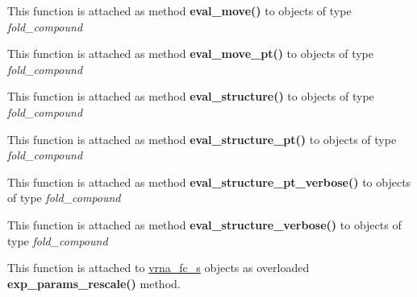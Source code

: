 \begin{DoxyRefList}
\item[\label{wrappers__wrappers000029}%
\hypertarget{wrappers__wrappers000029}{}%
Global \hyperlink{group__eval_gaff1b9e4f4d17b434b0a822fe783672c1}{vrna\+\_\+eval\+\_\+move} (vrna\+\_\+fold\+\_\+compound\+\_\+t $\ast$vc, const char $\ast$structure, int m1, int m2)]This function is attached as method {\bfseries eval\+\_\+move()} to objects of type {\itshape fold\+\_\+compound}  
\item[\label{wrappers__wrappers000030}%
\hypertarget{wrappers__wrappers000030}{}%
Global \hyperlink{group__eval_ga123dabc119ea98c968a5e903cc46f0fb}{vrna\+\_\+eval\+\_\+move\+\_\+pt} (vrna\+\_\+fold\+\_\+compound\+\_\+t $\ast$vc, short $\ast$pt, int m1, int m2)]This function is attached as method {\bfseries eval\+\_\+move\+\_\+pt()} to objects of type {\itshape fold\+\_\+compound}  
\item[\label{wrappers__wrappers000023}%
\hypertarget{wrappers__wrappers000023}{}%
Global \hyperlink{group__eval_ga58f199f1438d794a265f3b27fc8ea631}{vrna\+\_\+eval\+\_\+structure} (vrna\+\_\+fold\+\_\+compound\+\_\+t $\ast$vc, const char $\ast$structure)]This function is attached as method {\bfseries eval\+\_\+structure()} to objects of type {\itshape fold\+\_\+compound}  
\item[\label{wrappers__wrappers000024}%
\hypertarget{wrappers__wrappers000024}{}%
Global \hyperlink{group__eval_gadbd09372ddfd7a450bbd590c96a6bfe4}{vrna\+\_\+eval\+\_\+structure\+\_\+pt} (vrna\+\_\+fold\+\_\+compound\+\_\+t $\ast$vc, const short $\ast$pt)]This function is attached as method {\bfseries eval\+\_\+structure\+\_\+pt()} to objects of type {\itshape fold\+\_\+compound}  
\item[\label{wrappers__wrappers000026}%
\hypertarget{wrappers__wrappers000026}{}%
Global \hyperlink{group__eval_ga8a517cfeeae8c376ae7b1e0c401d38b4}{vrna\+\_\+eval\+\_\+structure\+\_\+pt\+\_\+verbose} (vrna\+\_\+fold\+\_\+compound\+\_\+t $\ast$vc, const short $\ast$pt, F\+I\+LE $\ast$file)]This function is attached as method {\bfseries eval\+\_\+structure\+\_\+pt\+\_\+verbose()} to objects of type {\itshape fold\+\_\+compound}  
\item[\label{wrappers__wrappers000025}%
\hypertarget{wrappers__wrappers000025}{}%
Global \hyperlink{group__eval_ga0928d699d310178f84ee2351034e5cb5}{vrna\+\_\+eval\+\_\+structure\+\_\+verbose} (vrna\+\_\+fold\+\_\+compound\+\_\+t $\ast$vc, const char $\ast$structure, F\+I\+LE $\ast$file)]This function is attached as method {\bfseries eval\+\_\+structure\+\_\+verbose()} to objects of type {\itshape fold\+\_\+compound}  
\item[\label{wrappers__wrappers000045}%
\hypertarget{wrappers__wrappers000045}{}%
Global \hyperlink{group__energy__parameters_gad607bc3a5b5da16400e2ca4ea5560233}{vrna\+\_\+exp\+\_\+params\+\_\+rescale} (vrna\+\_\+fold\+\_\+compound\+\_\+t $\ast$vc, double $\ast$mfe)]This function is attached to \hyperlink{group__fold__compound_structvrna__fc__s}{vrna\+\_\+fc\+\_\+s} objects as overloaded {\bfseries exp\+\_\+params\+\_\+rescale()} method.


\end{DoxyRefList}
